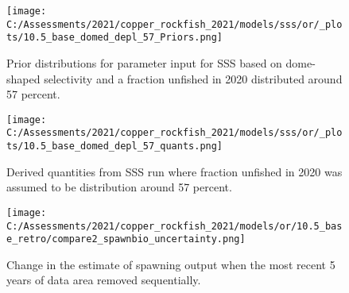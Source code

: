 \documentclass[11pt,
  english,
  a4paper,
]{article}
\begin{document}
\tagmcend\tagstructend

\newpage


\begin{figure}
\centering
\texttt{[image: C:/Assessments/2021/copper\_rockfish\_2021/models/sss/or/\_plots/10.5\_base\_domed\_depl\_57\_Priors.png]}
\caption{Prior distributions for parameter input for SSS based on dome-shaped selectivity and a fraction unfished in 2020 distributed around 57 percent.\label{fig:sss-prior-57}}
\end{figure}

\tagmcend\tagstructend

\newpage


\begin{figure}
\centering
\texttt{[image: C:/Assessments/2021/copper\_rockfish\_2021/models/sss/or/\_plots/10.5\_base\_domed\_depl\_57\_quants.png]}
\caption{Derived quantities from SSS run where fraction unfished in 2020 was assumed to be distribution around 57 percent.\label{fig:sss-quant-57}}
\end{figure}

\tagmcend\tagstructend

\newpage


\begin{figure}
\centering
\texttt{[image: C:/Assessments/2021/copper\_rockfish\_2021/models/or/10.5\_base\_retro/compare2\_spawnbio\_uncertainty.png]}
\caption{Change in the estimate of spawning output when the most recent 5 years of data area removed sequentially.\label{fig:retro-ssb}}
\end{figure}

\tagmcend\tagstructend

\end{document}
